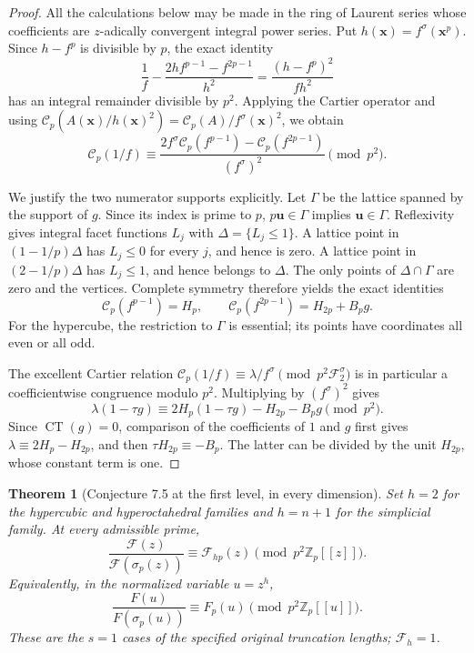 \documentclass[11pt,a4paper]{article}
\newtheorem{theorem}{Theorem}[section]
\theoremstyle{definition}\newtheorem{definition}[theorem]{Definition}
\theoremstyle{remark}\newtheorem{remark}[theorem]{Remark}
\numberwithin{equation}{section}
\begin{document}
\begin{proof}
All the calculations below may be made in the ring of Laurent series
whose coefficients are \(z\)-adically convergent integral power series.
Put \(h(\mathbf{x})=f^\sigma(\mathbf{x}^p)\).  Since \(h-f^p\) is
divisible by \(p\), the exact identity
\[
 \frac1f-\frac{2hf^{p-1}-f^{2p-1}}{h^2}
 =\frac{(h-f^p)^2}{fh^2}
\]
has an integral remainder divisible by \(p^2\).  Applying the Cartier
operator and using
\(\mathscr C_p(A(\mathbf{x})/h(\mathbf{x})^2)
 =\mathscr C_p(A) / f^\sigma(\mathbf{x})^2\), we obtain
\[
 \mathscr C_p(1/f)
 \equiv
 \frac{2f^\sigma\mathscr C_p(f^{p-1})
              -\mathscr C_p(f^{2p-1})}{(f^\sigma)^2}
 \pmod{p^2}.
\]

We justify the two numerator supports explicitly.  Let \(\Gamma\)
be the lattice spanned by the support of \(g\).  Since its index is
prime to \(p\), \(p\mathbf{u}\in\Gamma\) implies
\(\mathbf{u}\in\Gamma\).  Reflexivity gives integral facet functions
\(L_j\) with \(\Delta=\{L_j\leq1\}\).  A lattice point in
\((1-1/p)\Delta\) has \(L_j\leq0\) for every \(j\), and hence is
zero.  A lattice point in \((2-1/p)\Delta\) has \(L_j\leq1\), and
hence belongs to \(\Delta\).  The only points of
\(\Delta\cap\Gamma\) are zero and the vertices.  Complete symmetry
therefore yields the exact identities
\[
 \mathscr C_p(f^{p-1})=H_p,
 \qquad
 \mathscr C_p(f^{2p-1})=H_{2p}+B_p g.
\]
For the hypercube, the restriction to \(\Gamma\) is essential; its
points have coordinates all even or all odd.

The excellent Cartier relation
\(\mathscr C_p(1/f)\equiv\lambda/f^\sigma
 \pmod{p^2\mathscr F_2^\sigma}\)
is in particular a coefficientwise congruence modulo \(p^2\).
Multiplying by \((f^\sigma)^2\) gives
\[
 \lambda(1-\tau g)
 \equiv 2H_p(1-\tau g)-H_{2p}-B_p g\pmod{p^2}.
\]
Since \(\operatorname{CT}(g)=0\), comparison of the coefficients of
\(1\) and \(g\) first gives
\(\lambda\equiv2H_p-H_{2p}\), and then
\(\tau H_{2p}\equiv-B_p\).
The latter can be divided by the unit \(H_{2p}\), whose constant
term is one.
\end{proof}

\begin{theorem}[Conjecture 7.5 at the first level, in every dimension]
\label{T:thm:first-all-dim}
Set \(h=2\) for the hypercubic and hyperoctahedral families and
\(h=n+1\) for the simplicial family.  At every admissible prime,
\[
 \frac{\mathcal F(z)}{\mathcal F(\sigma_p(z))}
 \equiv\mathcal F_{hp}(z)\pmod{p^2\mathbb Z_p[[z]]}.
\]
Equivalently, in the normalized variable \(u=z^h\),
\[
 \frac{F(u)}{F(\sigma_p(u))}
 \equiv F_p(u)\pmod{p^2\mathbb Z_p[[u]]}.
\]
These are the \(s=1\) cases of the specified original truncation
lengths; \(\mathcal F_h=1\).
\end{theorem}
\end{document}
